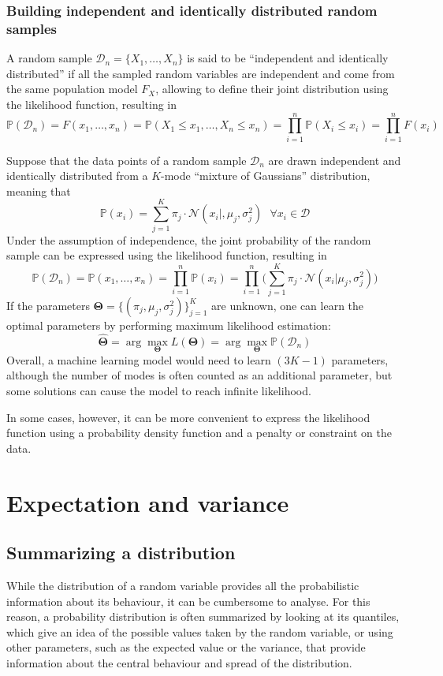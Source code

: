 \documentclass{report}
\begin{document}
\subsection{Building independent and identically distributed random samples}
A random sample $\displaystyle \mathcal{D}_n = \{X_1, \dots, X_n\}$ is said to be ``independent and identically distributed'' if all the sampled random variables are independent and come from the same population model $\displaystyle F_X$, allowing to define their joint distribution using the likelihood function, resulting in
\[\mathbb{P}(\mathcal{D}_n) = F(x_1, \dots, x_n) = \mathbb{P}(X_1 \leq x_1, \dots, X_n \leq x_n) = \prod_{i = 1}^n \mathbb{P}(X_i \leq x_i) = \prod_{i = 1}^n F(x_i)\]
\begin{examplebox}
    Suppose that the data points of a random sample $\displaystyle \mathcal{D}_n$ are drawn independent and identically distributed from a $\displaystyle K$-mode ``mixture of Gaussians'' distribution, meaning that
    \[\mathbb{P}(x_i) = \sum_{j = 1}^K \pi_j \cdot \mathcal{N}(x_i|, \mu_j, \sigma_j^2) \text{ } \forall x_i \in \mathcal{D}\]
    Under the assumption of independence, the joint probability of the random sample can be expressed using the likelihood function, resulting in
    \[\mathbb{P}(\mathcal{D}_n) = \mathbb{P}(x_1, \dots, x_n) = \prod_{i = 1}^n \mathbb{P}(x_i) = \prod_{i = 1}^n\Bigg(\sum_{j = 1}^K \pi_j \cdot \mathcal{N}(x_i|\mu_j, \sigma_j^2)\Bigg)\]
    If the parameters $\displaystyle \mathbf{\Theta} = \{(\pi_j, \mu_j, \sigma_j^2)\}_{j = 1}^K$ are unknown, one can learn the optimal parameters by performing maximum likelihood estimation:
    \[\hat{\mathbf{\Theta}} = \arg\max_{\mathbf{\Theta}} L(\mathbf{\Theta}) = \arg\max_{\mathbf{\Theta}} \mathbb{P}(\mathcal{D}_n)\]
    Overall, a machine learning model would need to learn $\displaystyle (3K - 1)$ parameters, although the number of modes is often counted as an additional parameter, but some solutions can cause the model to reach infinite likelihood.
\end{examplebox}
\noindent In some cases, however, it can be more convenient to express the likelihood function using a probability density function and a penalty or constraint on the data.

\chapter{Expectation and variance}
\section{Summarizing a distribution}
While the distribution of a random variable provides all the probabilistic information about its behaviour, it can be cumbersome to analyse. \newline
For this reason, a probability distribution is often summarized by looking at its quantiles, which give an idea of the possible values taken by the random variable, or using other parameters, such as the expected value or the variance, that provide information about the central behaviour and spread of the distribution.
\end{document}
